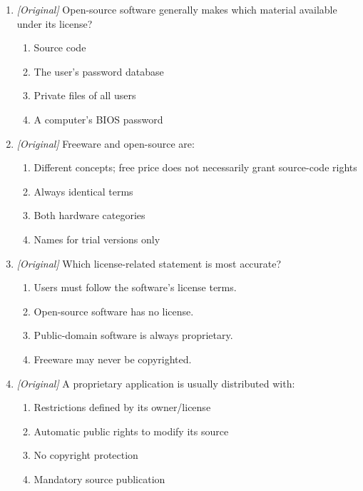 \begin{enumerate}[label=\textbf{Q\arabic*.}, leftmargin=*]
\begin{enumerate}[label=\Alph*.]
    \item It is always free of every licence condition.
    \item Open source forbids all commercial use.
  \end{enumerate}
\item \textit{[Original]} Open-source software generally makes which material available under its license?
  \begin{enumerate}[label=\Alph*.]
\item Source code
   \item The user's password database
   \item Private files of all users
   \item A computer's BIOS password
  \end{enumerate}

\item \textit{[Original]} Freeware and open-source are:
  \begin{enumerate}[label=\Alph*.]
\item Different concepts; free price does not necessarily grant source-code rights
   \item Always identical terms
   \item Both hardware categories
   \item Names for trial versions only
  \end{enumerate}

\item \textit{[Original]} Which license-related statement is most accurate?
  \begin{enumerate}[label=\Alph*.]
\item Users must follow the software's license terms.
   \item Open-source software has no license.
   \item Public-domain software is always proprietary.
   \item Freeware may never be copyrighted.
  \end{enumerate}

\item \textit{[Original]} A proprietary application is usually distributed with:
  \begin{enumerate}[label=\Alph*.]
\item Restrictions defined by its owner/license
   \item Automatic public rights to modify its source
   \item No copyright protection
   \item Mandatory source publication
  \end{enumerate}


\end{enumerate}
